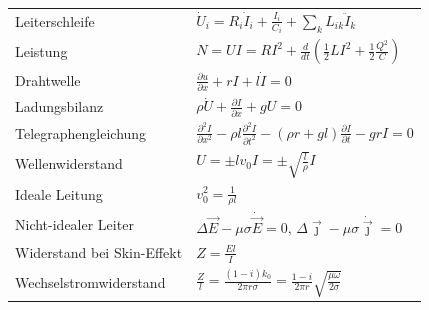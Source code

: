 \documentclass[12pt,a4paper]{article}
\renewcommand{\d}[2]{\frac{d #1}{d #2}}
\newcommand{\pd}[2]{\frac{\partial #1}{\partial #2}}
\newcommand{\pdd}[2]{\frac{\partial^2 #1}{\partial #2^2}}
\renewcommand{\=}[1]{\stackrel{#1}{=}}
\newcommand{\js}{\vec \jmath}
\theoremstyle{definition}
\theoremstyle{remark}
\begin{document}
\begin{center}
\begin{minipage}[t]{.35\linewidth}
\vspace{0pt}
\noindent\begin{tabular}{ll}
Leiterschleife &  $\dot U_i = R_i \dot I_i + \frac{I_i}{C_i} + \sum_k L_{ik} \ddot I_k$\\
Leistung & $N = U I = RI^2 + \d{}{t} (\frac{1}{2} LI^2 + \frac{1}{2} \frac{Q^2}{C})$\\
Drahtwelle & $\pd{u}{x} + rI +l \dot I = 0$\\
Ladungsbilanz & $\rho \dot U + \pd{I}{x} + gU = 0$\\
Telegraphengleichung & $\pdd{I}{x} - \rho l \pdd{I}{t} - (\rho r + gl) \pd{I}{t} - grI = 0$\\
Wellenwiderstand & $U = \pm l v_0 I = \pm \sqrt{\frac{l}{\rho}} I$\\
Ideale Leitung & $v_0^2 = \frac{1}{\rho l}$\\
Nicht-idealer Leiter & $\Delta \Vec E - \mu \sigma \dot{\vec{E}} = 0$, $\Delta \js - \mu \sigma \dot \js = 0$\\
Widerstand bei Skin-Effekt & $Z = \frac{El}{I}$\\
Wechselstromwiderstand & $\frac{Z}{l} = \frac{(1-i) k_0}{2\pi r \sigma} = \frac{1-i}{2\pi r} \sqrt{\frac{\mu \omega}{2 \sigma}}$\\
\end{tabular}
\end{minipage}%
\begin{minipage}[t]{.65\linewidth}
\vspace{0pt}
\begin{tabular}{ll}
\toprule

\bottomrule
\end{tabular}
\end{minipage}
\end{center}
\end{document}
